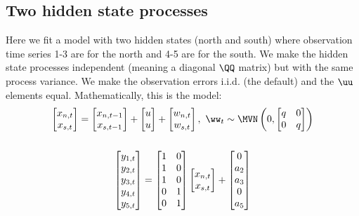 \subsection{Two hidden state processes}
Here we fit a model with two hidden states (north and south) where observation time series 1-3 are for the north and 4-5 are for the south.  We make the hidden state processes independent (meaning a diagonal $\QQ$ matrix) but with the same process variance.  We make the observation errors i.i.d. (the default) and the $\uu$ elements equal.  Mathematically, this is the model:
\begin{gather*}
\begin{bmatrix}x_{n,t}\\x_{s,t}\end{bmatrix}
= \begin{bmatrix}x_{n,t-1}\\x_{s,t-1}\end{bmatrix}
+ \begin{bmatrix}u\\u\end{bmatrix}
+ \begin{bmatrix}w_{n,t}\\w_{s,t}\end{bmatrix},   
 \textrm{ } \ww_t \sim \MVN\begin{pmatrix} 0,
 \begin{bmatrix}q&0\\0&q\end{bmatrix} \end{pmatrix} \\
\\
\begin{bmatrix}y_{1,t}\\y_{2,t}\\y_{3,t}\\y_{4,t}\\y_{5,t}\end{bmatrix}
= \begin{bmatrix}1&0\\1&0\\1&0\\0&1\\0&1\end{bmatrix}
\begin{bmatrix}x_{n,t}\\x_{s,t}\end{bmatrix}
+ \begin{bmatrix}0\\a_2\\a_3\\0\\a_5\end{bmatrix}

\end{gather*}

